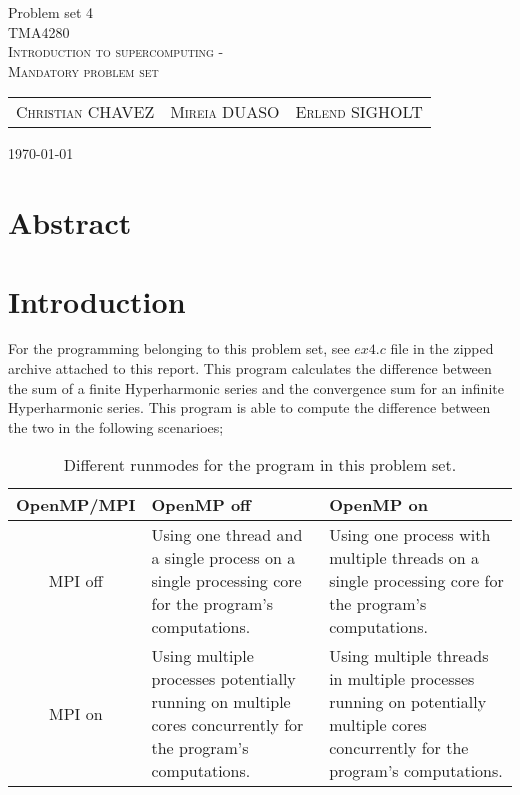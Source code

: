 \documentclass[fontsize=11pt,paper=a4,titlepage]{report}
\begin{document}
\begin{center}


{\huge Problem set 4}\\[0.5cm]

\textsc{\LARGE TMA4280}\\[0.5cm]
\textsc{\large Introduction to supercomputing -}\\
\textsc{\large Mandatory problem set}\\[0.6cm]

\begin{table}[h]
\centering
\begin{tabular}{ccc}
	\textsc{Christian CHAVEZ}	&	\textsc{Mireia DUASO}	&	\textsc{Erlend SIGHOLT}
\end{tabular}
\end{table}

\large{\today}
\vfill
\section*{Abstract}

\end{center}

\addtocounter{chapter}{1}

\clearpage
\section{Introduction}

For the programming belonging to this problem set, see $\textit{ex4.c}$ file in
the zipped archive attached to this report. This program calculates the
difference between the sum of a finite Hyperharmonic series and the convergence
sum for an infinite Hyperharmonic series. This program is able to compute the
difference between the two in the following scenarioes;


\begin{table}[h]
	\begin{tabularx}{\linewidth}{c|X|X|}
			OpenMP/MPI	& OpenMP off & OpenMP on	\\ \hline
			MPI off		& Using one thread and a single process on a single
processing core for the program's computations. & Using one process with
multiple threads on a single processing core for the program's
computations. \\ \hline
			MPI on		& Using multiple processes potentially running on
multiple cores concurrently for the program's computations. & Using multiple
threads in multiple processes running on potentially multiple cores concurrently
for the program's computations. \\ \hline
	\end{tabularx}
	\caption{Different runmodes for the program in this problem set.}
	\label{tab:RunModes}
\end{table}
\end{document}

